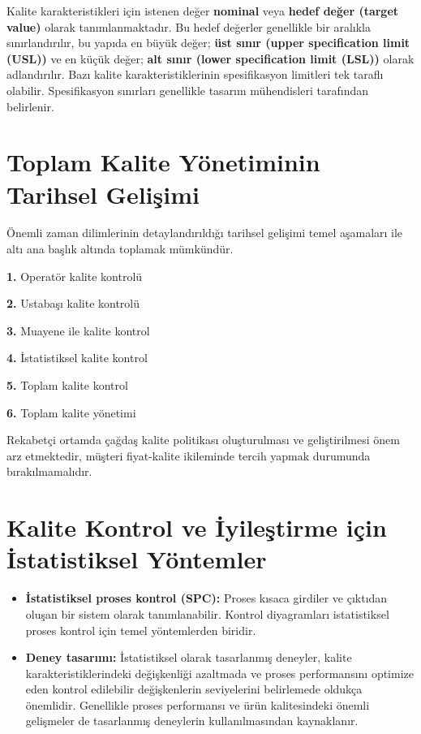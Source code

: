 \documentclass[
]{book}
\begin{document}
Kalite karakteristikleri için istenen değer \textbf{nominal} veya \textbf{hedef değer (target value)} olarak tanımlanmaktadır. Bu hedef değerler genellikle bir aralıkla sınırlandırılır, bu yapıda en büyük değer; \textbf{üst sınır (upper specification limit (USL))} ve en küçük değer; \textbf{alt sınır (lower specification limit (LSL))} olarak adlandırılır. Bazı kalite karakteristiklerinin spesifikasyon limitleri tek taraflı olabilir. Spesifikasyon sınırları genellikle tasarım mühendisleri tarafından belirlenir.

\hypertarget{toplam-kalite-yuxf6netiminin-tarihsel-geliux15fimi}{%
\section{Toplam Kalite Yönetiminin Tarihsel Gelişimi}\label{toplam-kalite-yuxf6netiminin-tarihsel-geliux15fimi}}

Önemli zaman dilimlerinin detaylandırıldığı tarihsel gelişimi temel aşamaları ile altı ana başlık altında toplamak mümkündür.

\textbf{1.} Operatör kalite kontrolü

\textbf{2.} Ustabaşı kalite kontrolü

\textbf{3.} Muayene ile kalite kontrol

\textbf{4.} İstatistiksel kalite kontrol

\textbf{5.} Toplam kalite kontrol

\textbf{6.} Toplam kalite yönetimi

Rekabetçi ortamda çağdaş kalite politikası oluşturulması ve geliştirilmesi önem arz etmektedir, müşteri fiyat-kalite ikileminde tercih yapmak durumunda bırakılmamalıdır.

\hypertarget{kalite-kontrol-ve-iyileux15ftirme-iuxe7in-istatistiksel-yuxf6ntemler}{%
\section{Kalite Kontrol ve İyileştirme için İstatistiksel Yöntemler}\label{kalite-kontrol-ve-iyileux15ftirme-iuxe7in-istatistiksel-yuxf6ntemler}}

\begin{itemize}
\item
  \textbf{İstatistiksel proses kontrol (SPC):} Proses kısaca girdiler ve çıktıdan oluşan bir sistem olarak tanımlanabilir. Kontrol diyagramları istatistiksel proses kontrol için temel yöntemlerden biridir.
\item
  \textbf{Deney tasarımı:} İstatistiksel olarak tasarlanmış deneyler, kalite karakteristiklerindeki değişkenliği azaltmada ve proses performansını optimize eden kontrol edilebilir değişkenlerin seviyelerini belirlemede oldukça önemlidir. Genellikle proses performansı ve ürün kalitesindeki önemli gelişmeler de tasarlanmış deneylerin kullanılmasından kaynaklanır.
\end{itemize}
\end{document}
